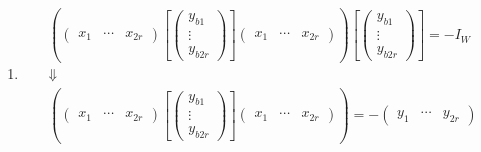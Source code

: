 \documentclass[aps,preprint]{revtex4}
\begin{document}
\begin{enumerate}
\item 
\begin{gather}
\left( \overset{}{\left( 
\begin{array}{ccc}
x_{1} & \cdots & x_{2r}%
\end{array}%
\right) \left[ \left( 
\begin{array}{c}
y_{b1} \\ 
\vdots \\ 
y_{b2r}%
\end{array}%
\right) \right] \left( 
\begin{array}{ccc}
x_{1} & \cdots & x_{2r}%
\end{array}%
\right) }\right) \left[ \left( 
\begin{array}{c}
y_{b1} \\ 
\vdots \\ 
y_{b2r}%
\end{array}%
\right) \right] =-I_{W} \\
\Downarrow \\
\left( \overset{}{\left( 
\begin{array}{ccc}
x_{1} & \cdots & x_{2r}%
\end{array}%
\right) \left[ \left( 
\begin{array}{c}
y_{b1} \\ 
\vdots \\ 
y_{b2r}%
\end{array}%
\right) \right] \left( 
\begin{array}{ccc}
x_{1} & \cdots & x_{2r}%
\end{array}%
\right) }\right) =-\left( 
\begin{array}{ccc}
y_{1} & \cdots & y_{2r}%
\end{array}%
\right)
\end{gather}


\end{enumerate}
\end{document}
